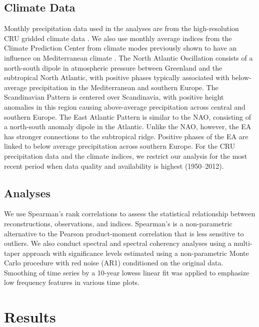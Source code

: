 \documentclass[draft,jgr]{AGUTeX}
\begin{document}
\begin{article}
\subsection{Climate Data}
\noindent Monthly precipitation data used in the analyses are from the high-resolution CRU gridded climate data \citep[TS3.21,][]{Harris2014}. We also use monthly average indices from the Climate Prediction Center from climate modes previously shown to have an influence on Mediterranean climate \citep{Sousa2011}. The North Atlantic Oscillation \citep[NAO;][]{Hurrell1995} consists of a north-south dipole in atmospheric pressure between Greenland and the subtropical North Atlantic, with positive phases typically associated with below-average precipitation in the Mediterranean and southern Europe. The Scandinavian Pattern \citep[SCA;][]{Bueh2007} is centered over Scandinavia, with positive height anomalies in this region causing above-average precipitation across central and southern Europe. The East Atlantic Pattern \citep[EA;][]{Barnston1987} is similar to the NAO, consisting of a north-south anomaly dipole in the Atlantic. Unlike the NAO, however, the EA has stronger connections to the subtropical ridge. Positive phases of the EA are linked to below average precipitation across southern Europe. For the CRU precipitation data and the climate indices, we restrict our analysis for the most recent period when data quality and availability is highest (1950--2012).

\subsection{Analyses}
\noindent We use Spearman's rank correlations to assess the statistical relationship between reconstructions, observations, and indices.  Spearman's is a non-parametric alternative to the Pearson product-moment correlation that is less sensitive to outliers. We also conduct spectral and spectral coherency analyses using a multi-taper approach \citep{Thomson:1982,Chave:etal1987,Mann:Lees1996,Czaja:Marshall2001,Huybers:2004} with significance levels estimated using a non-parametric Monte Carlo procedure with red noise (AR1) conditioned on the original data. Smoothing of time series by a 10-year lowess linear fit was applied to emphasize low frequency features in various time plots.

\section{Results}

\end{article}
\end{document}
